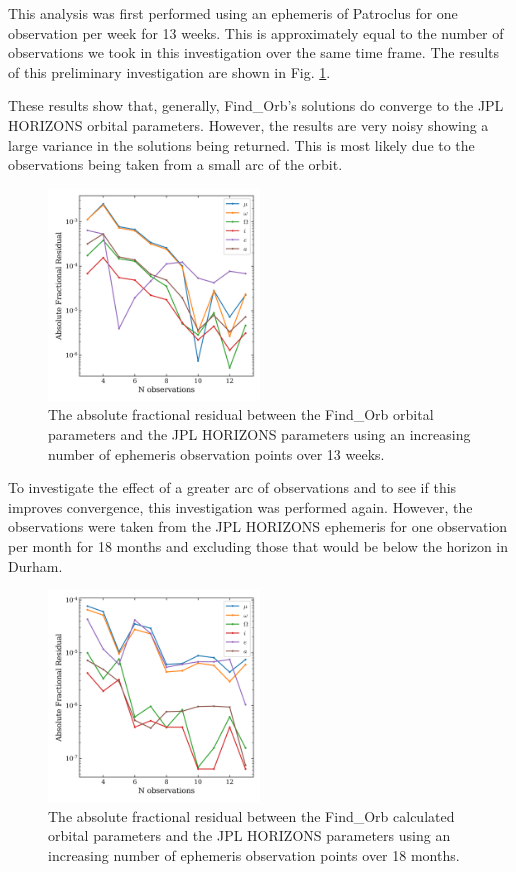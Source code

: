 \documentclass[10pt, twocolumn]{revtex4}    %
\begin{document}
This analysis was first performed using an ephemeris of Patroclus for one observation per week for 13 weeks. This is approximately equal to the number of observations we took in this investigation over the same time frame. The results of this preliminary investigation are shown in Fig. \ref{fig: JPL-find orb convergence}.

These results show that, generally, Find\_Orb's solutions do converge to the JPL HORIZONS orbital parameters. However, the results are very noisy showing a large variance in the solutions being returned. This is most likely due to the observations being taken from a small arc of the orbit.

\begin{figure}[h!]
\centering
\includegraphics[width=0.5\textwidth]{20180331_151420_JPL_FINDORB_CONVERGENCE}
\caption{The absolute fractional residual between the Find\_Orb orbital parameters and the JPL HORIZONS parameters using an increasing number of ephemeris observation points over 13 weeks.}
\label{fig: JPL-find orb convergence}
\end{figure}

To investigate the effect of a greater arc of observations and to see if this improves convergence, this investigation was performed again. However, the observations were taken from the JPL HORIZONS ephemeris for one observation per month for 18 months and excluding those that would be below the horizon in Durham.
\begin{figure}[h!]
\centering
\includegraphics[width=0.5\textwidth]{20180331_162447_JPL_FINDORB_CONVERGENCE2yr}
\caption{The absolute fractional residual between the Find\_Orb calculated orbital parameters and the JPL HORIZONS parameters using an increasing number of ephemeris observation points over 18 months.}
\label{fig: JPL-find orb convergence 18mth}
\end{figure}
\end{document}
